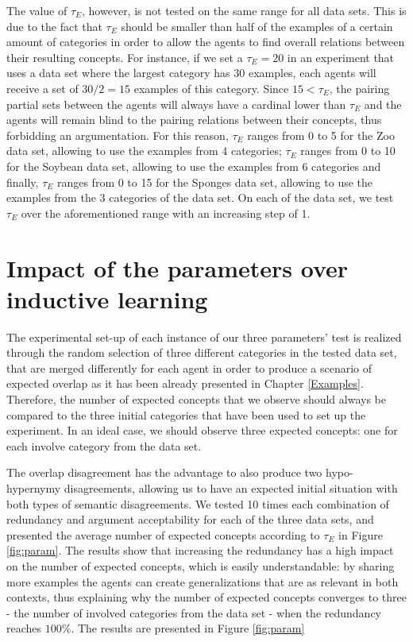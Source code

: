 The value of $\tau_{E}$, however, is not tested on the same range for all data sets. This is due to the fact that $\tau_{E}$ should be smaller than half of the examples of a certain amount of categories in order to allow the agents to find overall relations between their resulting concepts. For instance, if we set a $\tau_{E} = 20$ in an experiment that uses a data set where the largest category has $30$ examples, each agents will receive a set of $30/2 = 15$ examples of this category. Since $15 < \tau_{E}$, the pairing partial sets between the agents will always have a cardinal lower than $\tau_{E}$ and the agents will remain blind to the pairing relations between their concepts, thus forbidding an argumentation. For this reason, $\tau_{E}$ ranges from 0 to 5 for the Zoo data set, allowing to use the examples from 4 categories; $\tau_{E}$ ranges from 0 to 10 for the Soybean data set, allowing to use the examples from 6 categories and finally, $\tau_{E}$ ranges from 0 to 15 for the Sponges data set, allowing to use the examples from the 3 categories of the data set. On each of the data set, we test $\tau_{E}$ over the aforementioned range with an increasing step of 1.

\section{Impact of the parameters over inductive learning}

The experimental set-up of each instance of our three parameters' test is realized through the random selection of three different categories in the tested data set, that are merged differently for each agent in order to produce a scenario of expected overlap as it has been already presented in Chapter \ref{Examples}. Therefore, the number of expected concepts that we observe should always be compared to the three initial categories that have been used to set up the experiment. In an ideal case, we should observe three expected concepts: one for each involve category from the data set.

The overlap disagreement has the advantage to also produce two hypo-hypernymy disagreements, allowing us to have an expected initial situation with both types of semantic disagreements. We tested 10 times each combination of redundancy and argument acceptability for each of the three data sets, and presented the average number of expected concepts according to $\tau_{E}$ in Figure \ref{fig:param}. The results show that increasing the redundancy has a high impact on the number of expected concepts, which is easily understandable: by sharing more examples the agents can create generalizations that are as relevant in both contexts, thus explaining why the number of expected concepts converges to three - the number of involved categories from the data set - when the redundancy reaches $100 \%$. The results are presented in Figure \ref{fig:param}

